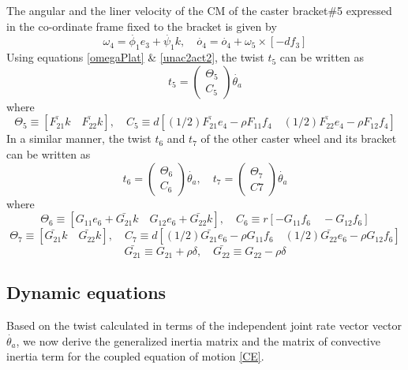 The angular and the liner velocity of the CM of the caster bracket\#5  expressed in the co-ordinate frame fixed to the bracket is given by
\begin{equation}
\omega_4=\dot{\phi_1}e_3+\dot{\psi_1}k, \quad
\dot{o_4}=\dot{o_4}+\omega_5\times [-df_3]
\end{equation}
Using equations   \ref{omegaPlat} \& \ref{unac2act2}, the twist $t_5$ can be written as
\begin{equation}
\label{twist5}
t_5=\begin{pmatrix}
\Theta_5\\C_5
\end{pmatrix}\dot{\theta_a}
\end{equation}
where
\[ \Theta_5 \equiv [\bar{F_{21}}k \quad \bar{F_{22}}k],\quad 
C_5\equiv d[(1/2)\bar{F_{21}}e_4-\rho F_{11}f_4 \quad (1/2)\bar{F_{22}}e_4-\rho F_{12}f_4]\]
In a similar manner, the twist $t_6$ and $t_7$  of the other caster wheel and its bracket can be written as 
\begin{equation}
\label{twist6}
t_6=\begin{pmatrix}
\Theta_6\\C_6
\end{pmatrix}\dot{\theta_a}, \quad t_7=\begin{pmatrix}
\Theta_7\\C7
\end{pmatrix}\dot{\theta_a}
\end{equation}
where
\[ \Theta_6 \equiv [G_{11}e_6+\bar{G_{21}}k \quad G_{12}e_6+\bar{G_{22}}k],\quad 
C_6 \equiv r[-G_{11}f_6 \quad -G_{12}f_6]\]
\[ \Theta_7 \equiv [\bar{G_{21}}k \quad \bar{G_{22}}k],\quad 
C_7 \equiv d[(1/2)\bar{G_{21}}e_6-\rho G_{11}f_6 \quad (1/2)\bar{G_{22}}e_6-\rho G_{12}f_6]\]
\[\bar{G_{21}} \equiv G_{21}+\rho \delta, \quad \bar{G_{22}}\equiv G_{22}-\rho\delta\] 

\subsection{Dynamic equations}
Based on the twist calculated in terms of the independent joint rate vector vector $\dot{\theta_a}$, we now derive the generalized inertia matrix and the matrix of convective inertia term for the coupled equation of motion \ref{CE}.
